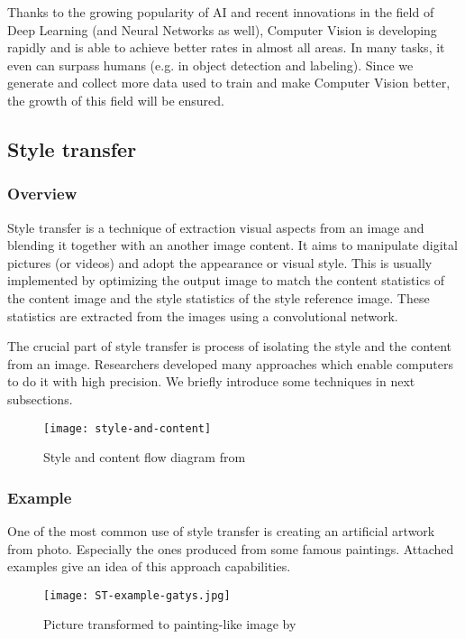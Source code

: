 \documentclass[../Main.tex]{subfiles}
\begin{document}
    Thanks to the growing popularity of AI and recent innovations in the field of Deep Learning (and Neural Networks as well), Computer Vision is developing rapidly and is able to achieve better rates in almost all areas. In many tasks, it even can surpass humans (e.g. in object detection and labeling). Since we generate and collect more data used to train and make Computer Vision better, the growth of this field will be ensured. 

\subsection{Style transfer}
    \subsubsection{Overview}
    Style transfer is a technique of extraction visual aspects from an image and blending it together with an another image content. It aims to manipulate digital pictures (or videos) and adopt the appearance or visual style. This is usually implemented by optimizing the output image to match the content statistics of the content image and the style statistics of the style reference image. These statistics are extracted from the images using a convolutional network. 
    
    The crucial part of style transfer is process of isolating the style and the content from an image. Researchers developed many approaches which enable computers to do it with high precision. We briefly introduce some techniques in next subsections.
    \begin{figure}[ht]
        \centering
        \texttt{[image: style-and-content]}
        \caption{Style and content flow diagram from \cite{ulyanov2016instance}}
        \label{fig:style-and-content}
    \end{figure}
    
    \subsubsection{Example}
    One of the most common use of style transfer is creating an artificial artwork  from photo. Especially the ones produced from some famous paintings. Attached examples give an idea of this approach capabilities. \\
    \begin{figure}[ht!]
        \centering
        \texttt{[image: ST-example-gatys.jpg]}
        \caption{Picture transformed to painting-like image by \cite{gatys2015neural}}
        \label{fig:ST-example-gatys}
    \end{figure}
\end{document}
